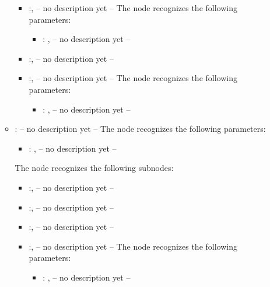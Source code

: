 \begin{itemize}
\begin{itemize}
\begin{itemize}
            \item {}:, 
              -- no description yet --
              The  node recognizes the following parameters:
                \begin{itemize}
                  \item {}: , 
                    -- no description yet --
              \end{itemize}

            \item {}:, 
              -- no description yet --

            \item {}:, 
              -- no description yet --
              The  node recognizes the following parameters:
                \begin{itemize}
                  \item {}: , 
                    -- no description yet --
              \end{itemize}
          \end{itemize}

        \item {}:
          -- no description yet --
          The  node recognizes the following parameters:
            \begin{itemize}
              \item {}: , 
                -- no description yet --
          \end{itemize}

          The  node recognizes the following subnodes:
          \begin{itemize}
            \item {}:, 
              -- no description yet --

            \item {}:, 
              -- no description yet --

            \item {}:, 
              -- no description yet --

            \item {}:, 
              -- no description yet --
              The  node recognizes the following parameters:
                \begin{itemize}
                  \item {}: , 
                    -- no description yet --
              \end{itemize}


\end{itemize}
\end{itemize}
\end{itemize}
